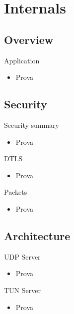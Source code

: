 \documentclass{beamer}
\begin{document}
\section{Internals}
\subsection{Overview}
\begin{frame}{Application}
	\begin{itemize}
	\item Prova
	\end{itemize}
\end{frame}
\subsection{Security}
\begin{frame}{Security summary}
	\begin{itemize}
	\item Prova
	\end{itemize}
\end{frame}
\begin{frame}{DTLS}
	\begin{itemize}
	\item Prova
	\end{itemize}
\end{frame}
\begin{frame}{Packets}
	\begin{itemize}
	\item Prova
	\end{itemize}
\end{frame}
\subsection{Architecture}
\begin{frame}{UDP Server}
	\begin{itemize}
	\item Prova
	\end{itemize}
\end{frame}
\begin{frame}{TUN Server}
	\begin{itemize}
	\item Prova
	\end{itemize}
\end{frame}
\end{document}
